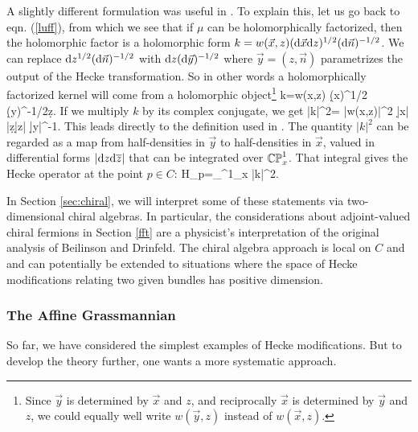 \documentclass[11pt,a4paper]{article}
\begin{document}
  A slightly different formulation was useful in \cite{EFK2}.  To explain this, let us go back to 
 eqn. (\ref{luff}), from which we see that if $\mu$ can be holomorphically factorized, then the holomorphic
 factor is a holomorphic form $k = w(\vec x,z) (\mathrm d \vec x    \mathrm d z)^{1/2}  (\mathrm d \vec n)^{-1/2}$.    We can replace $\mathrm d z^{1/2} (\mathrm d\vec n)^{-1/2}$ with
 $\mathrm d z (\mathrm d \vec y)^{-1/2}$ where $\vec y=(z,\vec n)$ parametrizes the output of the Hecke transformation.   So in other words a holomorphically factorized kernel
 will come from a holomorphic object\footnote{Since $\vec y$ is determined by $\vec x$ and $z$, and reciprocally $\vec x$ is determined by $\vec y$ and $z$,
 we could equally well write $w(\vec y,z)$ instead of $w(\vec x,z)$.}
 \be\label{conf} k=w(\vec x,z) (\d \vec x)^{1/2} (\d\vec y)^{-1/2}\d z. \ee 
 If we multiply $k$ by its complex conjugate, we get
 \be\label{onf}|k|^2= |w(\vec x,z)|^2 |\d\vec x| |\d z\d\bar z| |\d\vec y|^{-1}.\ee
 This leads directly to the definition used in \cite{EFK2}.   The quantity $|k|^2$ can be regarded as a map from half-densities in $\vec y$ to half-densities in $\vec x$,
 valued in differential forms $|\mathrm d z \mathrm d\overline z|$ that can be integrated over ${\mathbb{CP}}^1_x$.    That integral gives the Hecke operator at the point $p\in C$:
 \be\label{tonf} H_p=\int_{\bCP^1_x} |k|^2. \ee
  
 
 
In Section \ref{sec:chiral}, we will interpret some of these statements via two-dimensional chiral algebras.
In particular, the considerations about adjoint-valued chiral fermions in Section \ref{fft} are a physicist's interpretation of the original analysis of Beilinson
and Drinfeld.
The chiral algebra approach is local on $C$ and and can potentially be extended to 
situations where the space of Hecke modifications relating two given bundles has positive dimension.


\subsubsection{The Affine Grassmannian}\label{affgr}


So far, we have considered the simplest examples of Hecke modifications.   But to develop the theory
further, one wants a more systematic approach.   
\end{document}
